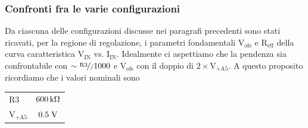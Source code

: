 \subsubsection{Confronti fra le varie configurazioni}

Da ciascuna delle configurazioni discusse nei paragrafi precedenti sono stati ricavati, per la regione di regolazione, i parametri fondamentali $\mathrm{V_{ofs}}$ e $\mathrm{R_{eff}}$ della curva caratteristica $\mathrm{V_{IN}}$ vs. $\mathrm{I_{IN}}$. Idealmente ci aspettiamo che la pendenza sia confrontabile con $\sim\nicefrac{\mathrm{R3}}/1000$ e $\mathrm{V_{ofs}}$ con il doppio di $2\times \mathrm{V_{+A5}}$. A questo proposito ricordiamo che i valori nominali sono 
\begin{center}
\begin{tabular}{lc}
\hline
$\mathrm{R3}$ & $600{\rm \, k\Omega}$ \\%
$\mathrm{V_{+A5}}$ & $0.5\rm \; V$\\
\hline
\end{tabular}
\end{center}

